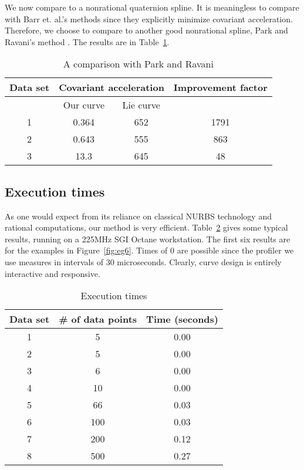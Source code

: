 We now compare to a nonrational quaternion spline.
It is meaningless to compare with Barr et. al.'s methods \cite{barr92,rama97}
since they explicitly minimize covariant acceleration.
Therefore, we choose to compare to another good nonrational spline,
Park and Ravani's method \cite{park97}.
The results are in Table~\ref{tab:cov3}.


\begin{table}
\begin{tabular}{|c|c|c|c|}  	\hline
Data set & \multicolumn{2}{c|}{Covariant acceleration} & Improvement factor \\ \hline
	 & Our curve & Lie curve & \\ \hline
1 & 0.364 & 652 & 1791 \\ \hline
2 & 0.643 & 555 & 863 \\ \hline
3 & 13.3  & 645 & 48 \\ \hline
\end{tabular}
\caption{A comparison with Park and Ravani}
\label{tab:cov3}
\end{table}

\subsection{Execution times}

As one would expect from its reliance on classical NURBS technology
and rational computations, our method is very efficient.
Table~\ref{tab:time} gives some typical results,
running on a 225MHz SGI Octane workstation.
The first six results are for the examples in Figure~\ref{fig:eg6}.
Times of 0 are possible since the profiler we use measures in intervals
of 30 microseconds.
Clearly, curve design is entirely interactive and responsive.

\begin{table}
\begin{tabular}{|c|c|c|}  	\hline
Data set & \# of data points & Time (seconds) \\ \hline
1 & 5 & 0.00 \\ \hline
2 & 5 & 0.00 \\ \hline
3 & 6 & 0.00 \\ \hline
4 & 10 & 0.00 \\ \hline
5 & 66 & 0.03 \\ \hline
6 & 100 & 0.03 \\ \hline
7 & 200 & 0.12 \\ \hline	%
8 & 500 & 0.27 \\ \hline	%
\end{tabular}
\caption{Execution times}
\label{tab:time}
\end{table}

